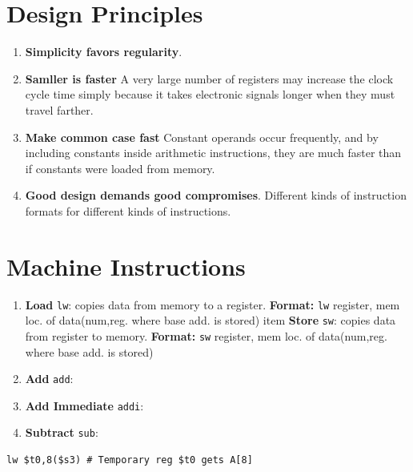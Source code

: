 \documentclass[a4paper,oneside]{book}
\begin{document}
\section{Design Principles}
\begin{enumerate}
\item  \textbf{Simplicity favors regularity}.
\item \textbf{Samller is faster}  A very large number of registers may increase the clock cycle time simply because it takes electronic signals longer when they must travel farther.
\item \textbf{Make common case fast} Constant operands occur frequently, and by including constants inside arithmetic
instructions, they are much faster than if constants were loaded from memory.
\item \textbf{Good design demands good compromises}. Different kinds of instruction formats for different kinds of instructions.
\end{enumerate}
\section{Machine Instructions \cite[p.67,90]{patterson2013computer}}
\begin{enumerate}
\item \textbf{Load} \texttt{lw}: copies data from memory to a register. \textbf{Format:} \texttt{lw} register, mem loc. of data(num,reg. where base add. is stored) 
item \textbf{Store} \texttt{sw}: copies data from register to memory. \textbf{Format:} \texttt{sw} register, mem loc. of data(num,reg. where base add. is stored) 
\item \textbf{Add} \texttt{add}:
\item \textbf{Add Immediate} \texttt{addi}:
\item \textbf{Subtract} \texttt{sub}:
\end{enumerate}
\begin{verbatim}
lw $t0,8($s3) # Temporary reg $t0 gets A[8]
\end{verbatim}
\end{document}
